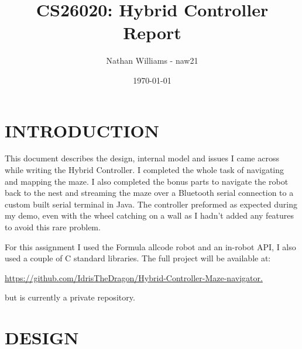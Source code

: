 \documentclass[11pt,a4paper,titlepage]{article}
\title{CS26020: Hybrid Controller Report}
\author{Nathan Williams - naw21}
\date{\today}
\begin{document}
    \maketitle
    \tableofcontents
    \listoffigures
    \newpage
    \section{INTRODUCTION}
        This document describes the design, internal model and issues I came across while writing the Hybrid Controller. 
        I completed the whole task of navigating and mapping the maze. 
        I also completed the bonus parts to navigate the robot back to the nest and streaming the maze over a Bluetooth serial connection to a custom built serial terminal in Java.
        The controller preformed as expected during my demo, even with the wheel catching on a wall as I hadn't added any features to avoid this rare problem.
        
        For this assignment I used the Formula allcode robot \cite{Formula all-code} and an in-robot API\cite{in-robot api}, I also used a couple of C standard libraries.
        The full project will be available at:

        \url{https://github.com/IdrisTheDragon/Hybrid-Controller-Maze-navigator.}

        but is currently a private repository.
    \section{DESIGN}
\end{document}
